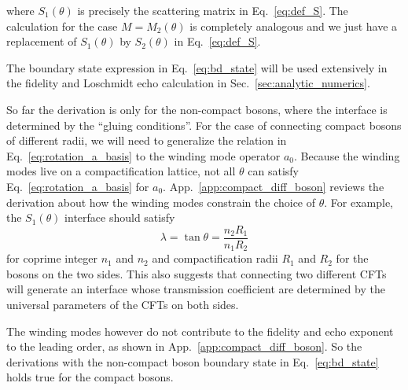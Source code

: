 where $S_1(\theta) $ is precisely the scattering matrix in Eq.~\eqref{eq:def_S}. The calculation for the case $M=M_2(\theta)$ is completely analogous and we just have a replacement of $S_1( \theta ) $ by $S_2( \theta )$ in Eq.~\eqref{eq:def_S}. 

The boundary state expression in Eq.~\eqref{eq:bd_state} will be used extensively in the fidelity and Loschmidt echo calculation in Sec.~\ref{sec:analytic_numerics}. 

So far the derivation is only for the non-compact bosons, where the interface is determined by the ``gluing conditions''. For the case of connecting compact bosons of different radii, we will need to generalize the relation in Eq.~\eqref{eq:rotation_a_basis} to the winding mode operator $a_0$. Because the winding modes live on a compactification lattice, not all $\theta$ can satisfy Eq.~\eqref{eq:rotation_a_basis} for $a_0$. App.~\ref{app:compact_diff_boson} reviews the derivation about how the winding modes constrain the choice of $\theta$. For example, the $S_1(\theta)$ interface should satisfy
\begin{equation}
\lambda = \tan \theta = \frac{n_2 R_1}{n_1 R_2}
\end{equation}
for coprime integer $n_1$ and $n_2$ and compactification radii $R_1$ and $R_2$ for the bosons on the two sides. This also suggests that connecting two different CFTs will generate an interface whose transmission coefficient are determined by the universal parameters of the CFTs on both sides. 

The winding modes however do not contribute to the fidelity and echo exponent to the leading order, as shown in App.~\ref{app:compact_diff_boson}. So the derivations with the non-compact boson boundary state in Eq.~\eqref{eq:bd_state} holds true for the compact bosons.

